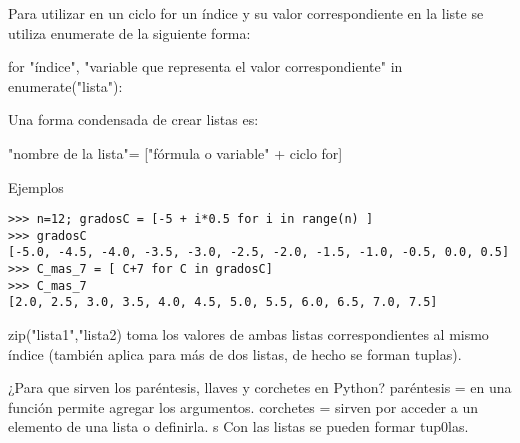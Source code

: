 \documentclass[letter paper, 12pt, oneside]{article}
\begin{document}
Para utilizar en un ciclo for un índice y su valor correspondiente en la liste se utiliza enumerate de la siguiente forma:

for "índice", "variable que representa el valor correspondiente" in enumerate("lista"):

Una forma condensada de crear listas es:

"nombre de la lista"= ["fórmula o variable" + ciclo for]

Ejemplos
\begin{verbatim}
>>> n=12; gradosC = [-5 + i*0.5 for i in range(n) ]
>>> gradosC
[-5.0, -4.5, -4.0, -3.5, -3.0, -2.5, -2.0, -1.5, -1.0, -0.5, 0.0, 0.5]
>>> C_mas_7 = [ C+7 for C in gradosC]
>>> C_mas_7
[2.0, 2.5, 3.0, 3.5, 4.0, 4.5, 5.0, 5.5, 6.0, 6.5, 7.0, 7.5]
\end{verbatim}

zip("lista1","lista2) toma los valores de ambas listas correspondientes al mismo índice (también aplica para más de dos listas, de hecho se forman tuplas).

¿Para que sirven los paréntesis, llaves y corchetes en Python?
paréntesis = en una función permite agregar los argumentos.
corchetes = sirven por acceder a un elemento de una lista o definirla.
s
Con las listas se pueden formar tup0las. 
\end{document}
